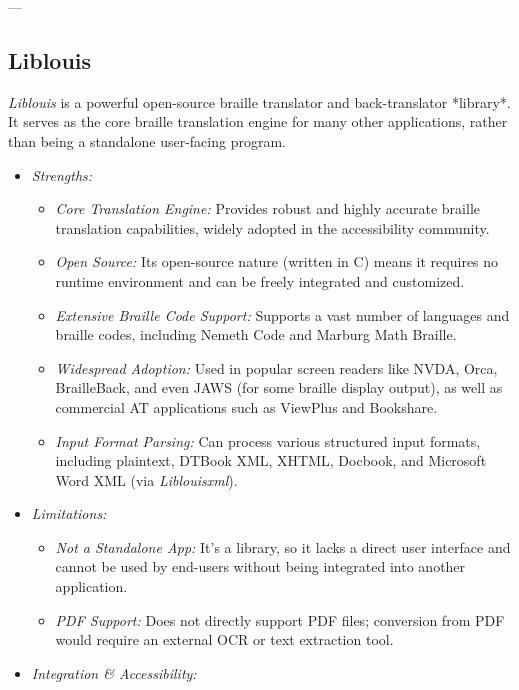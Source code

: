 ---

\subsection{Liblouis}
\emph{Liblouis} is a powerful open-source braille translator and back-translator *library*. It serves as the core braille translation engine for many other applications, rather than being a standalone user-facing program.

\begin{itemize}
    \item \emph{Strengths:}
    \begin{itemize}
        \item \emph{Core Translation Engine:} Provides robust and highly accurate braille translation capabilities, widely adopted in the accessibility community.
        \item \emph{Open Source:} Its open-source nature (written in C) means it requires no runtime environment and can be freely integrated and customized.
        \item \emph{Extensive Braille Code Support:} Supports a vast number of languages and braille codes, including Nemeth Code and Marburg Math Braille.
        \item \emph{Widespread Adoption:} Used in popular screen readers like NVDA, Orca, BrailleBack, and even JAWS (for some braille display output), as well as commercial AT applications such as ViewPlus and Bookshare.
        \item \emph{Input Format Parsing:} Can process various structured input formats, including plaintext, DTBook XML, XHTML, Docbook, and Microsoft Word XML (via \emph{Liblouisxml})\footnotemark{}.
    \end{itemize}
    \item \emph{Limitations:}
    \begin{itemize}
        \item \emph{Not a Standalone App:} It's a library, so it lacks a direct user interface and cannot be used by end-users without being integrated into another application.
        \item \emph{PDF Support:} Does not directly support PDF files; conversion from PDF would require an external OCR or text extraction tool.
    \end{itemize}
    \item \emph{Integration \& Accessibility:}
    \begin{itemize}

\end{itemize}
\end{itemize}
